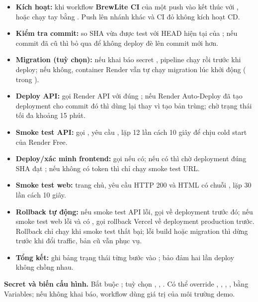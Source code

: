 \begin{itemize}
  \item \textbf{Kích hoạt:}  khi workflow \textbf{BrewLite CI} của một push
    vào  kết thúc với , hoặc chạy tay bằng
    . Push lên nhánh khác và CI đỏ không kích hoạt CD.
  \item \textbf{Kiểm tra commit:} so SHA vừa được test với HEAD hiện tại của ; nếu
    commit đã cũ thì bỏ qua để không deploy đè lên commit mới hơn.
  \item \textbf{Migration (tuỳ chọn):} nếu khai báo secret , pipeline
    chạy  rồi  trước khi deploy; nếu không, container
    Render vẫn tự chạy migration lúc khởi động ( trong ).
  \item \textbf{Deploy API:} gọi Render API  với đúng
    ; nếu Render Auto-Deploy đã tạo deployment cho commit đó thì dùng lại thay vì
    tạo bản trùng; chờ trạng thái  tối đa khoảng 15 phút.
  \item \textbf{Smoke test API:} gọi , yêu cầu ,
    lặp 12 lần cách 10 giây để chịu cold start của Render Free.
  \item \textbf{Deploy/xác minh frontend:} gọi  nếu có; nếu có
     thì chờ deployment đúng SHA đạt ; nếu không có token thì chỉ
    chạy smoke test URL.
  \item \textbf{Smoke test web:}  trang chủ, yêu cầu HTTP 200 và HTML có chuỗi
    , lặp 30 lần cách 10 giây.
  \item \textbf{Rollback tự động:} nếu smoke test API lỗi, gọi
     về deployment  trước đó; nếu smoke test web
    lỗi và có , gọi rollback Vercel về deployment production trước. Rollback
    chỉ chạy khi smoke test thất bại; lỗi build hoặc migration thì dừng trước khi đổi traffic, bản
    cũ vẫn phục vụ.
  \item \textbf{Tổng kết:} ghi bảng trạng thái từng bước vào ;
     bảo đảm hai lần deploy không chồng nhau.
\end{itemize}

\textbf{Secret và biến cấu hình.} Bắt buộc ; tuỳ chọn
, , . Có thể override
, , , ,
 bằng Variables; nếu không khai báo, workflow dùng giá trị của môi trường
demo.

